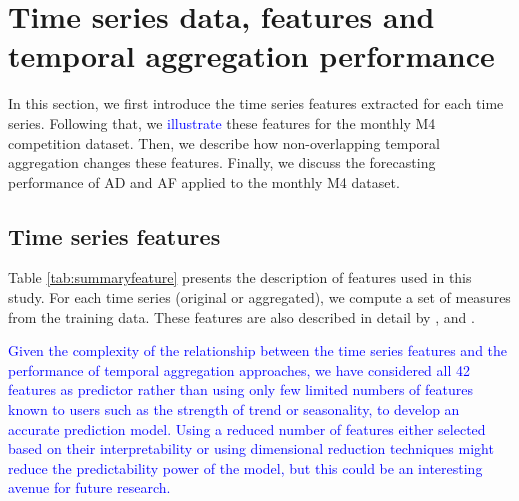 \documentclass[preprint, 3p,
authoryear]{elsarticle} %
\begin{document}
\hypertarget{tsfeatures}{%
\section{Time series data, features and temporal aggregation
performance}\label{tsfeatures}}

In this section, we first introduce the time series features extracted
for each time series. Following that, we \textcolor{blue}{illustrate}
these features for the monthly M4 competition dataset. Then, we describe
how non-overlapping temporal aggregation changes these features.
Finally, we discuss the forecasting performance of AD and AF applied to
the monthly M4 dataset.

\hypertarget{time-series-features}{%
\subsection{Time series features}\label{time-series-features}}

Table \ref{tab:summaryfeature} presents the description of features used
in this study. For each time series (original or aggregated), we compute
a set of measures from the training data. These features are also
described in detail by \citet{wang2009rule}, \citet{hyndman2015large}
and \citet{hyndman2021forecasting}.

\textcolor{blue}{Given the complexity of the relationship between the time series features and the performance of temporal aggregation approaches, we have considered all 42 features as predictor rather than using only few limited numbers of features known to users such as the strength of trend or seasonality, to develop an accurate prediction model. Using a reduced number of features either selected based on their interpretability or using dimensional reduction techniques might reduce the predictability power of the model, but this could be an interesting avenue for future research.}
\end{document}

